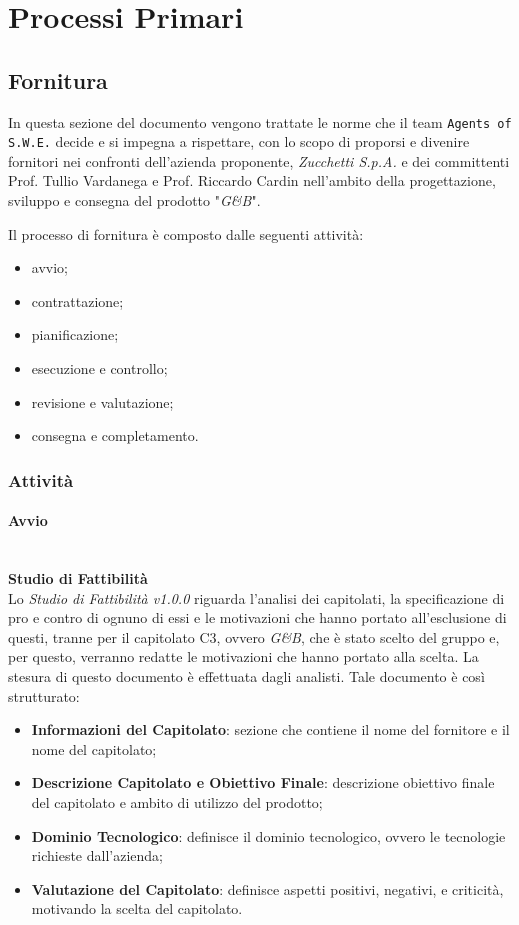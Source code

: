 \section{Processi Primari}\label{ProcessiPrimari}

\subsection{Fornitura}\label{Fornitura}
In questa sezione del documento vengono trattate le norme che il team \texttt{Agents of S.W.E.} decide e si impegna a rispettare, con lo scopo di proporsi e divenire fornitori nei confronti dell'azienda proponente, \textit{Zucchetti S.p.A.} e dei committenti Prof. Tullio Vardanega e Prof. Riccardo Cardin nell'ambito della progettazione, sviluppo e consegna del prodotto "\textit{G\&B}".

Il processo di fornitura è composto dalle seguenti attività:
\begin{itemize}
	\item avvio;
	\item contrattazione;
	\item pianificazione;
	\item esecuzione e controllo;
	\item revisione e valutazione;
	\item consegna e completamento.
\end{itemize}


\subsubsection{Attività}
\paragraph{Avvio} \-\\

\textbf{Studio di Fattibilità} \\ 
Lo \textit{Studio di Fattibilità v1.0.0} riguarda l'analisi dei capitolati, la specificazione di pro e contro di ognuno di essi e le motivazioni che hanno portato all'esclusione di questi, tranne per il capitolato C3, ovvero \textit{G\&B}, che è stato scelto del gruppo e, per questo, verranno redatte le motivazioni che hanno portato alla scelta. La stesura di questo documento è effettuata dagli analisti.
Tale documento è così strutturato:
\begin{itemize}
	\item \textbf{Informazioni del Capitolato}: sezione che contiene il nome del fornitore e il nome del capitolato;
	\item \textbf{Descrizione Capitolato e Obiettivo Finale}: descrizione obiettivo finale del capitolato e ambito di utilizzo del prodotto;
	\item \textbf{Dominio Tecnologico}: definisce il dominio tecnologico, ovvero le tecnologie richieste dall'azienda;
	\item \textbf{Valutazione del Capitolato}: definisce aspetti positivi, negativi, e criticità, motivando la scelta del capitolato.
\end{itemize}

